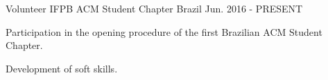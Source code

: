 \begin{cventries}
  \cventry
    {Volunteer} %
    {IFPB ACM Student Chapter} %
    {Brazil} %
    {Jun. 2016 - PRESENT} %
    {
      \begin{cvitems} %
        \item {Participation in the opening procedure of  the first Brazilian ACM Student Chapter.}
        \item {Development of soft skills.}
      \end{cvitems}
    }

\end{cventries}
